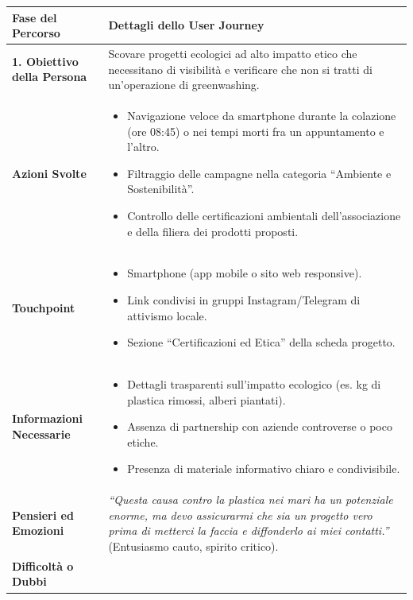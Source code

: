\documentclass[11pt,a4paper]{article}
\begin{document}
\begin{table}[h!]
\centering
\small
\begin{tabular}{|p{3.2cm}|p{11.8cm}|}
\hline
\textbf{Fase del Percorso} & \textbf{Dettagli dello User Journey} \\ \hline
\hline
\textbf{1. Obiettivo della Persona} & Scovare progetti ecologici ad alto impatto etico che necessitano di visibilità e verificare che non si tratti di un'operazione di greenwashing. \\ \hline
\textbf{Azioni Svolte} &
\begin{itemize}[leftmargin=*,nosep]
    \item Navigazione veloce da smartphone durante la colazione (ore 08:45) o nei tempi morti fra un appuntamento e l'altro.
    \item Filtraggio delle campagne nella categoria ``Ambiente e Sostenibilità''.
    \item Controllo delle certificazioni ambientali dell'associazione e della filiera dei prodotti proposti.
\end{itemize} \\ \hline
\textbf{Touchpoint} &
\begin{itemize}[leftmargin=*,nosep]
    \item Smartphone (app mobile o sito web responsive).
    \item Link condivisi in gruppi Instagram/Telegram di attivismo locale.
    \item Sezione ``Certificazioni ed Etica'' della scheda progetto.
\end{itemize} \\ \hline
\textbf{Informazioni Necessarie} &
\begin{itemize}[leftmargin=*,nosep]
    \item Dettagli trasparenti sull'impatto ecologico (es. kg di plastica rimossi, alberi piantati).
    \item Assenza di partnership con aziende controverse o poco etiche.
    \item Presenza di materiale informativo chiaro e condivisibile.
\end{itemize} \\ \hline
\textbf{Pensieri ed Emozioni} &
\textit{``Questa causa contro la plastica nei mari ha un potenziale enorme, ma devo assicurarmi che sia un progetto vero prima di metterci la faccia e diffonderlo ai miei contatti.''} (Entusiasmo cauto, spirito critico). \\ \hline
\textbf{Difficoltà o Dubbi} &
\begin{itemize}[leftmargin=*,nosep]

\end{itemize}
\end{tabular}
\end{table}
\end{document}
